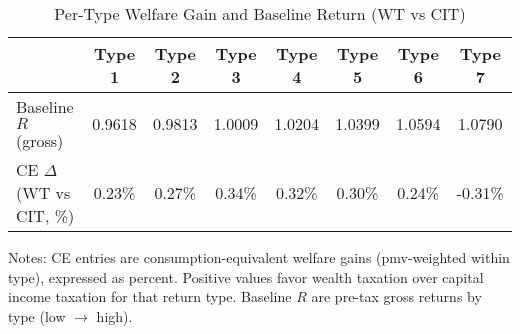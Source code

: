 \begin{table}[!htbp]
\centering
\caption{Per-Type Welfare Gain and Baseline Return (WT vs CIT)}
\label{tab:ce_per_type_wt_vs_cit}
\begin{threeparttable}
\begin{tabular}{lccccccc}
\toprule
& \textbf{Type 1} & \textbf{Type 2} & \textbf{Type 3} & \textbf{Type 4} & \textbf{Type 5} & \textbf{Type 6} & \textbf{Type 7} \\
\midrule
Baseline $R$ (gross) & 0.9618 & 0.9813 & 1.0009 & 1.0204 & 1.0399 & 1.0594 & 1.0790 \\
CE $\Delta$ (WT vs CIT, \%) & 0.23\% & 0.27\% & 0.34\% & 0.32\% & 0.30\% & 0.24\% & -0.31\% \\
\bottomrule
\end{tabular}
\begin{tablenotes}[flushleft]
\footnotesize
\item Notes: CE entries are consumption-equivalent welfare gains (pmv-weighted within type), expressed as percent. Positive values favor wealth taxation over capital income taxation for that return type. Baseline $R$ are pre-tax gross returns by type (low $\rightarrow$ high).
\end{tablenotes}
\end{threeparttable}
\end{table}
